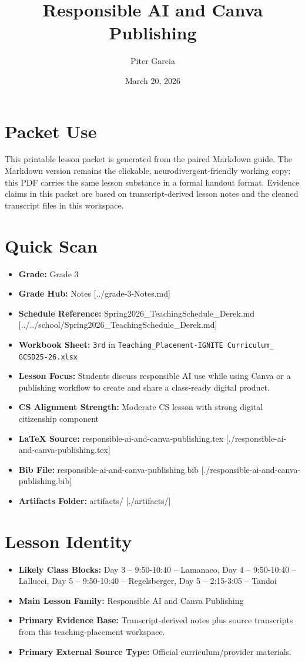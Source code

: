 \documentclass[11pt]{article}
\title{Responsible AI and Canva Publishing}
\author{Piter Garcia}
\date{March 20, 2026}
\begin{document}
\maketitle
\section*{Packet Use}
This printable lesson packet is generated from the paired Markdown guide. The Markdown version remains the clickable, neurodivergent-friendly working copy; this PDF carries the same lesson substance in a formal handout format. Evidence claims in this packet are based on transcript-derived lesson notes and the cleaned transcript files in this workspace.

\section*{Quick Scan}
\begin{itemize}[leftmargin=*]
\item \textbf{Grade:} Grade 3
\item \textbf{Grade Hub:} Notes [../grade-3-Notes.md]
\item \textbf{Schedule Reference:} Spring2026\_TeachingSchedule\_Derek.md [../../school/Spring2026\_TeachingSchedule\_Derek.md]
\item \textbf{Workbook Sheet:} \texttt{3rd} in \texttt{Teaching\_Placement-IGNITE Curriculum\_ GCSD25-26.xlsx}
\item \textbf{Lesson Focus:} Students discuss responsible AI use while using Canva or a publishing workflow to create and share a class-ready digital product.
\item \textbf{CS Alignment Strength:} Moderate CS lesson with strong digital citizenship component
\item \textbf{LaTeX Source:} responsible-ai-and-canva-publishing.tex [./responsible-ai-and-canva-publishing.tex]
\item \textbf{Bib File:} responsible-ai-and-canva-publishing.bib [./responsible-ai-and-canva-publishing.bib]
\item \textbf{Artifacts Folder:} artifacts/ [./artifacts/]
\end{itemize}

\section*{Lesson Identity}
\begin{itemize}[leftmargin=*]
\item \textbf{Likely Class Blocks:} Day 3 -- 9:50-10:40 -- Lamanaco, Day 4 -- 9:50-10:40 -- Lallucci, Day 5 -- 9:50-10:40 -- Regelsberger, Day 5 -- 2:15-3:05 -- Tandoi
\item \textbf{Main Lesson Family:} Responsible AI and Canva Publishing
\item \textbf{Primary Evidence Base:} Transcript-derived notes plus source transcripts from this teaching-placement workspace.
\item \textbf{Primary External Source Type:} Official curriculum/provider materials.
\end{itemize}
\end{document}
